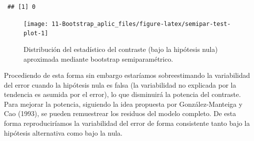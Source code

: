 \documentclass[
]{book}
\newenvironment{Shaded}{\begin{snugshade}}{\end{snugshade}}
\newcommand{\AttributeTok}[1]{\textcolor[rgb]{0.77,0.63,0.00}{#1}}
\newcommand{\CommentTok}[1]{\textcolor[rgb]{0.56,0.35,0.01}{\textit{#1}}}
\newcommand{\ConstantTok}[1]{\textcolor[rgb]{0.00,0.00,0.00}{#1}}
\newcommand{\DecValTok}[1]{\textcolor[rgb]{0.00,0.00,0.81}{#1}}
\newcommand{\FunctionTok}[1]{\textcolor[rgb]{0.00,0.00,0.00}{#1}}
\newcommand{\NormalTok}[1]{#1}
\newcommand{\OtherTok}[1]{\textcolor[rgb]{0.56,0.35,0.01}{#1}}
\newcommand{\SpecialCharTok}[1]{\textcolor[rgb]{0.00,0.00,0.00}{#1}}
\newcommand{\StringTok}[1]{\textcolor[rgb]{0.31,0.60,0.02}{#1}}
\theoremstyle{break}
\theoremstyle{nonumberplain}
\renewcommand{\CommentTok}[1]{\textcolor[rgb]{0.41,0.41,0.41}{\texttt{#1}}}
\begin{document}
\begin{Shaded}
\end{Shaded}

\begin{verbatim}
 ## [1] 0
\end{verbatim}

\begin{figure}[!htb]

{\centering \texttt{[image: 11-Bootstrap\_aplic\_files/figure-latex/semipar-test-plot-1]} 

}

\caption{Distribución del estadístico del contraste (bajo la hipótesis nula) aproximada mediante bootstrap semiparamétrico.}\label{fig:semipar-test-plot}
\end{figure}

Procediendo de esta forma sin embargo estaríamos sobreestimando la variabilidad
del error cuando la hipótesis nula es falsa (la variabilidad no explicada por la
tendencia es asumida por el error), lo que disminuirá la potencia del contraste.
Para mejorar la potencia, siguiendo la idea propuesta por González-Manteiga
y Cao (1993), se pueden remuestrear los residuos del modelo completo.
De esta forma reproduciríamos la variabilidad del error de forma consistente
tanto bajo la hipótesis alternativa como bajo la nula.
\end{document}
